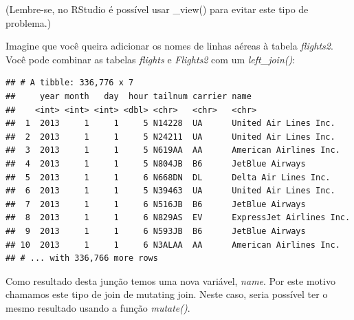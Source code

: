 \documentclass[
]{article}
\newenvironment{Shaded}{\begin{snugshade}}{\end{snugshade}}
\newcommand{\DataTypeTok}[1]{\textcolor[rgb]{0.13,0.29,0.53}{#1}}
\newcommand{\KeywordTok}[1]{\textcolor[rgb]{0.13,0.29,0.53}{\textbf{#1}}}
\newcommand{\NormalTok}[1]{#1}
\newcommand{\OperatorTok}[1]{\textcolor[rgb]{0.81,0.36,0.00}{\textbf{#1}}}
\newcommand{\StringTok}[1]{\textcolor[rgb]{0.31,0.60,0.02}{#1}}
\begin{document}
(Lembre-se, no RStudio é possível usar \_view() para evitar este tipo de
problema.)

Imagine que você queira adicionar os nomes de linhas aéreas à tabela
\emph{flights2}. Você pode combinar as tabelas \emph{flights} e
\emph{Flights2} com um \emph{left\_join()}:

\begin{Shaded}
\end{Shaded}

\begin{verbatim}
## # A tibble: 336,776 x 7
##     year month   day  hour tailnum carrier name                    
##    <int> <int> <int> <dbl> <chr>   <chr>   <chr>                   
##  1  2013     1     1     5 N14228  UA      United Air Lines Inc.   
##  2  2013     1     1     5 N24211  UA      United Air Lines Inc.   
##  3  2013     1     1     5 N619AA  AA      American Airlines Inc.  
##  4  2013     1     1     5 N804JB  B6      JetBlue Airways         
##  5  2013     1     1     6 N668DN  DL      Delta Air Lines Inc.    
##  6  2013     1     1     5 N39463  UA      United Air Lines Inc.   
##  7  2013     1     1     6 N516JB  B6      JetBlue Airways         
##  8  2013     1     1     6 N829AS  EV      ExpressJet Airlines Inc.
##  9  2013     1     1     6 N593JB  B6      JetBlue Airways         
## 10  2013     1     1     6 N3ALAA  AA      American Airlines Inc.  
## # ... with 336,766 more rows
\end{verbatim}

Como resultado desta junção temos uma nova variável, \emph{name}. Por
este motivo chamamos este tipo de join de mutating join. Neste caso,
seria possível ter o mesmo resultado usando a função \emph{mutate()}.

\begin{Shaded}
\end{Shaded}
\end{document}
